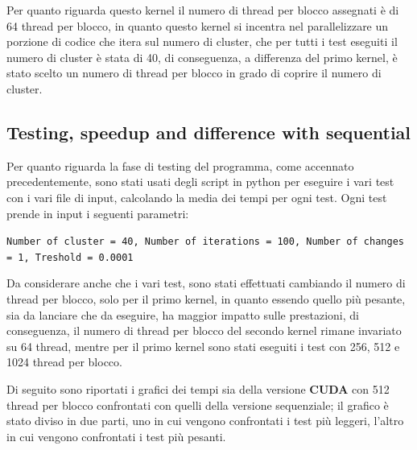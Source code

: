 \documentclass{article}
\begin{document}
  Per quanto riguarda questo kernel il numero di thread per blocco assegnati è di 64 thread per blocco, in quanto questo kernel si incentra nel parallelizzare un porzione di codice che itera sul numero di cluster, che per tutti i test eseguiti il numero 
  di cluster è stata di 40, di conseguenza, a differenza del primo kernel, è stato scelto un numero di thread per blocco in grado di coprire il numero di cluster.
  \subsection{Testing, speedup and difference with sequential}
  Per quanto riguarda la fase di testing del programma, come accennato precedentemente, sono stati usati degli script in python per eseguire i vari test con i vari file di input, calcolando la media dei tempi per ogni test.
  Ogni test prende in input i seguenti parametri:
  \begin{center}
    \small\verb|Number of cluster = 40, Number of iterations = 100, Number of changes = 1, Treshold = 0.0001|
  \end{center}
  Da considerare anche che i vari test, sono stati effettuati cambiando il numero di thread per blocco, solo per il primo kernel, in quanto essendo quello più pesante, sia da lanciare che da eseguire, ha maggior impatto sulle prestazioni, di conseguenza, il numero 
  di thread per blocco del secondo kernel rimane invariato su 64 thread, mentre per il primo kernel sono stati eseguiti i test con 256, 512 e 1024 thread per blocco.
  
  Di seguito sono riportati i grafici dei tempi sia della versione \textbf{CUDA} con 512 thread per blocco confrontati con quelli della versione sequenziale; il grafico è stato diviso in due parti, uno in cui vengono confrontati i test più leggeri, l'altro in cui vengono confrontati i 
  test più pesanti.
  
\end{document}
